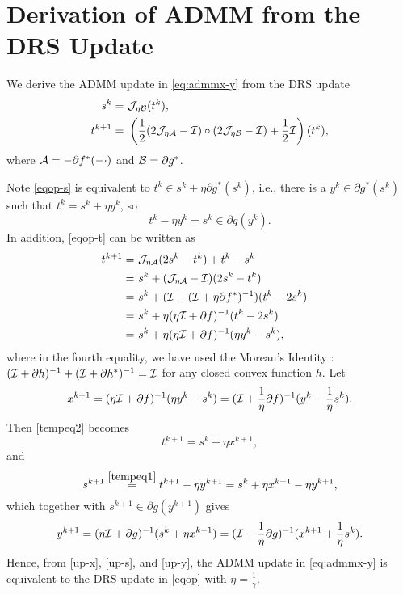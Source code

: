 \section{Derivation of ADMM from the DRS Update}\label{sec:drs-admm}
We derive the ADMM update in \eqref{eq:admmx-y} from the DRS update \begin{subequations}\label{eqop}
\begin{align}
s^k=&\ \cJ_{\eta \cB}(t^k),\label{eqop-s}\\
t^{k+1}=&\ \left(\frac{1}{2}(2\cJ_{\eta\cA}-\cI)\circ(2\cJ_{\eta \cB}-\cI)+\frac{1}{2}\cI\right)(t^k)\label{eqop-t},
\end{align}
\end{subequations} 
where ${\mathcal{A}}=-\partial f^*(-\cdot)$ and ${\mathcal{B}}=\partial g^*$.


Note \eqref{eqop-s} is equivalent to $t^k\in s^k+\eta \partial g^*(s^k)$, i.e., there is a $y^k\in \partial g^*(s^k)$ such that $t^k = s^k+\eta y^k$, so
\begin{equation}\label{tempeq1}
t^k-\eta y^k=s^k\in\partial g(y^k).
\end{equation} 
In addition, \eqref{eqop-t} can be written as
\begin{align}
t^{k+1}=&\ \cJ_{\eta\cA}(2s^k-t^k)+t^k-s^k\cr
=&\ s^k+(\cJ_{\eta\cA}-\cI)(2s^k-t^k)\cr
=&\ s^k+(\cI-(\cI+\eta\partial f^*)^{-1})(t^k-2s^k)\cr
=&\ s^k+\eta(\eta\cI+\partial f)^{-1}(t^k-2s^k)\cr
=&\ s^k+\eta(\eta\cI+\partial f)^{-1}(\eta y^k-s^k),\label{tempeq2}
\end{align} 
where in the fourth equality, we have used the Moreau's Identity \cite{rockafellar1997convex}: $({\mathcal{I}}+\partial h)^{-1}+({\mathcal{I}}+\partial h^*)^{-1}={\mathcal{I}}$ for any closed convex function $h$. Let
\begin{equation}\label{up-x}
x^{k+1}=(\eta\cI+\partial f)^{-1}(\eta y^k-s^k)=(\cI+\frac{1}{\eta}\partial f)^{-1}(y^k-\frac{1}{\eta}s^k).
\end{equation}
Then \eqref{tempeq2} becomes
\begin{equation*}
t^{k+1}=s^k+\eta x^{k+1},
\end{equation*}
and 
\begin{equation}\label{up-s}
s^{k+1}\overset{\eqref{tempeq1}}=t^{k+1}-\eta y^{k+1}=s^k+\eta x^{k+1}-\eta y^{k+1},
\end{equation}
which together with $s^{k+1}\in\partial g(y^{k+1})$ gives
\begin{equation}\label{up-y}
y^{k+1}=(\eta\cI+\partial g)^{-1}(s^k+\eta x^{k+1})=(\cI+\frac{1}{\eta}\partial g)^{-1}(x^{k+1}+\frac{1}{\eta}s^k).
\end{equation}
Hence, from \eqref{up-x}, \eqref{up-s}, and \eqref{up-y}, the ADMM update in \eqref{eq:admmx-y} is equivalent to the DRS update in \eqref{eqop} with $\eta=\frac{1}{\gamma}$.
